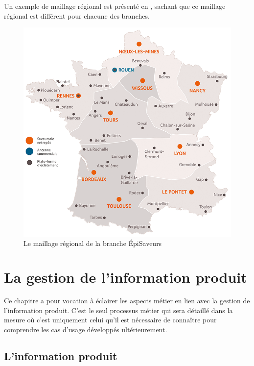             Un exemple de maillage régional est présenté en , sachant que ce maillage régional est différent pour chacune des branches.
            \begin{figure}[htpb]
                \begin{center}
                \includegraphics[width=\linewidth]{img/reseau es.png}
                \end{center}
                \caption{Le maillage régional de la branche \'{E}piSaveurs}
                \label{fig:reseau_es}
            \end{figure}


    \chapter{La gestion de l'information produit}
    
    \large
    Ce chapitre a pour vocation à éclairer les aspects métier en lien avec la gestion de l'information produit. 
    C'est le seul processus métier qui sera détaillé dans la mesure où c'est uniquement celui qu'il est nécessaire de connaître pour comprendre les cas d'usage développés ultérieurement.
    \normalsize

        \section{L'information produit}
        
